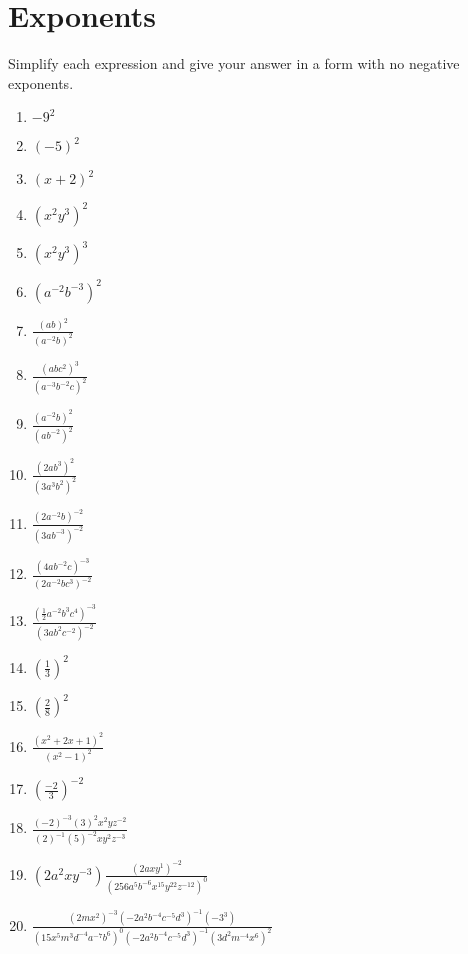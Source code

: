 \documentclass{article}
\begin{document}
\section{Exponents}
Simplify each expression and give your answer in a form with no negative exponents.
\begin{enumerate}
\item $-9^{2}$
\item $(-5)^{2}$
\item $(x+2)^{2}$
\item $(x^{2}y^{3})^{2}$
\item $(x^{2}y^{3})^{3}$
\item $(a^{-2}b^{-3})^{2}$
\item {\Large $\frac{(ab)^{2}}{(a^{-2}b)^{2}}$}
\item {\Large $\frac{(abc^{2})^{3}}{(a^{-3}b^{-2}c)^{2}}$}
\item {\Large $\frac{(a^{-2}b)^{2}}{(ab^{-2})^{2}}$}
\item {\Large $\frac{(2ab^{3})^{2}}{(3a^{3}b^{2})^{2}}$}
\item {\Large $\frac{(2a^{-2}b)^{-2}}{(3ab^{-3})^{-2}}$}
\item {\Large $\frac{(4ab^{-2}c)^{-3}}{(2a^{-2}bc^{3})^{-2}}$}
\item {\Large $\frac{(\frac{1}{2}a^{-2}b^{3}c^{4})^{-3}}{(3ab^{2}c^{-2})^{-2}}$}
\item {\Large $(\frac{1}{3})^{2}$}
\item {\Large $(\frac{2}{8})^{2}$}
\item {\Large $\frac{(x^{2}+2x+1)^{2}}{(x^{2}-1)^{2}}$}
\item {\Large $(\frac{-2}{3})^{-2}$}
\item {\Large $\frac{(-2)^{-3}(3)^{2}x^{2}yz^{-2}}{(2)^{-1}(5)^{-2}xy^{2}z^{-3}}$}
\item {\Large $(2a^{2}xy^{-3})\frac{(2axy^{1})^{-2}}{(256a^{5}b^{-6}x^{15}y^{22}z^{-12})^{0}}$}
\item {\Large $\frac{(2mx^{2})^{-3}(-2a^{2}b^{-4}c^{-5}d^{3})^{-1}(-3^{3})}{(15x^{5}m^{3}d^{-4}a^{-7}b^{6})^{0}(-2a^{2}b^{-4}c^{-5}d^{3})^{-1}(3d^{2}m^{-4}x^{6})^{2}}$}
\end{enumerate}

\newpage
\end{document}
